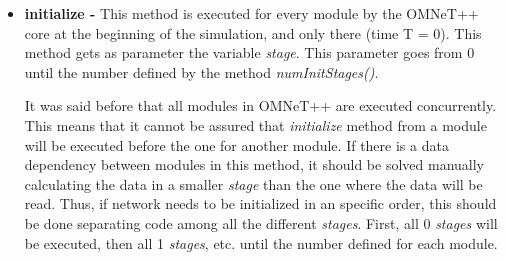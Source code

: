 \begin{itemize}
 \item \textbf{initialize - }This method is executed for every module by the \ac{OMNeT++} core  at the beginning of the simulation, and only there 
(time T = 0). This method gets as parameter the variable \textit{stage}. This parameter goes from 0 until the number defined by the method 
\textit{numInitStages()}.

It was said before that all modules in \ac{OMNeT++} are executed concurrently. This means that it cannot be assured that \textit{initialize} method from 
a module will be executed before the one for another module. If there is a data dependency between modules in this method, it should be solved
manually calculating the data in a smaller \textit{stage} than the one where the data will be read. Thus, if network needs to be initialized in an 
specific order, this should be done separating code among all the different \textit{stages}. First, all 0 \textit{stages} will be executed, then all 
1 \textit{stages}, etc. until the number defined for each module.


\end{itemize}

